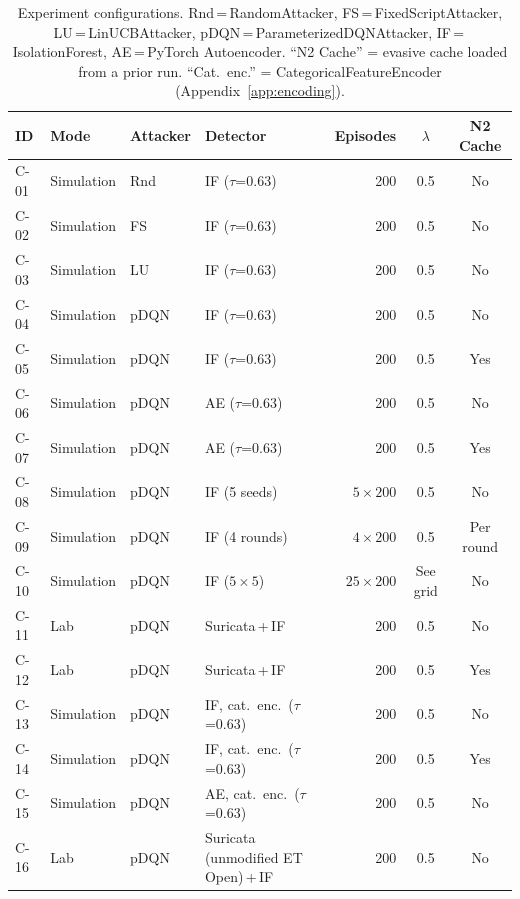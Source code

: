 \documentclass[sigconf]{acmart}
\begin{document}
\begin{table}[t]
\caption{Experiment configurations. Rnd\,=\,RandomAttacker, FS\,=\,FixedScriptAttacker,
LU\,=\,LinUCBAttacker, pDQN\,=\,ParameterizedDQNAttacker, IF\,=\,IsolationForest,
AE\,=\,PyTorch Autoencoder. ``N2 Cache'' = evasive cache loaded from a prior run.
``Cat.\ enc.'' = CategoricalFeatureEncoder (Appendix~\ref{app:encoding}).}
\label{tab:configs}
\centering
\small
\begin{tabular}{l l l l r c c}
\toprule
ID & Mode & Attacker & Detector & Episodes & $\lambda$ & N2 Cache \\
\midrule
C-01 & Simulation & Rnd  & IF ($\tau$=0.63)  & 200         & 0.5 & No \\
C-02 & Simulation & FS   & IF ($\tau$=0.63)  & 200         & 0.5 & No \\
C-03 & Simulation & LU   & IF ($\tau$=0.63)  & 200         & 0.5 & No \\
C-04 & Simulation & pDQN & IF ($\tau$=0.63)  & 200         & 0.5 & No \\
C-05 & Simulation & pDQN & IF ($\tau$=0.63)  & 200         & 0.5 & Yes \\
C-06 & Simulation & pDQN & AE ($\tau$=0.63)  & 200         & 0.5 & No \\
C-07 & Simulation & pDQN & AE ($\tau$=0.63)  & 200         & 0.5 & Yes \\
C-08 & Simulation & pDQN & IF (5 seeds)      & $5\times200$& 0.5 & No \\
C-09 & Simulation & pDQN & IF (4 rounds)     & $4\times200$& 0.5 & Per round \\
C-10 & Simulation & pDQN & IF ($5\times5$)   & $25\times200$& See grid & No \\
C-11 & Lab        & pDQN & Suricata\,+\,IF   & 200         & 0.5 & No \\
C-12 & Lab        & pDQN & Suricata\,+\,IF   & 200         & 0.5 & Yes \\
C-13 & Simulation & pDQN & IF, cat.\ enc.\ ($\tau$=0.63) & 200 & 0.5 & No \\
C-14 & Simulation & pDQN & IF, cat.\ enc.\ ($\tau$=0.63) & 200 & 0.5 & Yes \\
C-15 & Simulation & pDQN & AE, cat.\ enc.\ ($\tau$=0.63) & 200 & 0.5 & No \\
C-16 & Lab        & pDQN & Suricata (unmodified ET Open)\,+\,IF & 200 & 0.5 & No \\
\bottomrule
\end{tabular}
\end{table}
\end{document}
